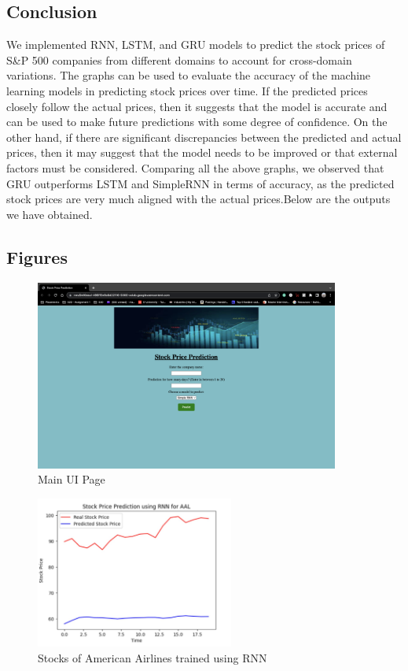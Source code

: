 \documentclass{article}
\begin{document}
\subsection{Conclusion}
We implemented RNN, LSTM, and GRU models to predict the stock prices of S\&P 500 companies from different domains to account for cross-domain variations. The graphs can be used to evaluate the accuracy of the machine learning models in predicting stock prices over time. If the predicted prices closely follow the actual prices, then it suggests that the model is accurate and can be used to make future predictions with some degree of confidence. On the other hand, if there are significant discrepancies between the predicted and actual prices, then it may suggest that the model needs to be improved or that external factors must be considered. Comparing all the above graphs, we observed that GRU outperforms LSTM and SimpleRNN in terms of accuracy, as the predicted stock prices are very much aligned with the actual prices.Below are the outputs we have obtained.
\subsection{Figures}
\begin{figure}[htp]
    \centering
    \includegraphics[width=10cm]{UI_MAIN.png}
    \caption{Main UI Page}
\end{figure}
\begin{figure}[htp]
    \centering
    \includegraphics[width=6.5cm]{AAL_RNN.jpg}
    \caption{Stocks of American Airlines trained using RNN}
\end{figure}
\end{document}
